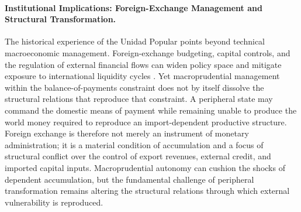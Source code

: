\paragraph{Institutional Implications: Foreign-Exchange Management and Structural Transformation.}
The historical experience of the Unidad Popular points beyond technical macroeconomic management. Foreign-exchange budgeting, capital controls, and the regulation of external financial flows can widen policy space and mitigate exposure to international liquidity cycles \citep{FfrenchDavis2018}. Yet macroprudential management within the balance-of-payments constraint does not by itself dissolve the structural relations that reproduce that constraint. A peripheral state may command the domestic means of payment while remaining unable to produce the world money required to reproduce an import-dependent productive structure. Foreign exchange is therefore not merely an instrument of monetary administration; it is a material condition of accumulation and a focus of structural conflict over the control of export revenues, external credit, and imported capital inputs. Macroprudential autonomy can cushion the shocks of dependent accumulation, but the fundamental challenge of peripheral transformation remains altering the structural relations through which external vulnerability is reproduced.
